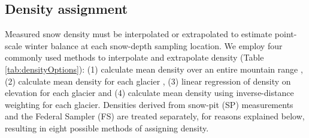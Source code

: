 \documentclass[review,oneside, letterpaper]{igs}
\begin{document}
\subsection{Density assignment}

Measured snow density must be interpolated or extrapolated to estimate point-scale winter balance at each snow-depth sampling location. We employ four commonly used methods to interpolate and extrapolate density (Table \ref{tab:densityOptions}): (1) calculate mean density over an entire mountain range \citep[e.g.][]{Cullen2017}, (2) calculate mean density for each glacier \citep[e.g.][]{Elder1991, McGrath2015}, (3) linear regression of density on elevation for each glacier \citep[e.g.][]{Elder1998, Molotch2005} and (4) calculate mean density using inverse-distance weighting \citep[e.g.][]{Molotch2005} for each glacier.  Densities derived from snow-pit (SP) measurements and the Federal Sampler (FS) are treated separately, for reasons explained below, resulting in eight possible methods of assigning density.
\end{document}
